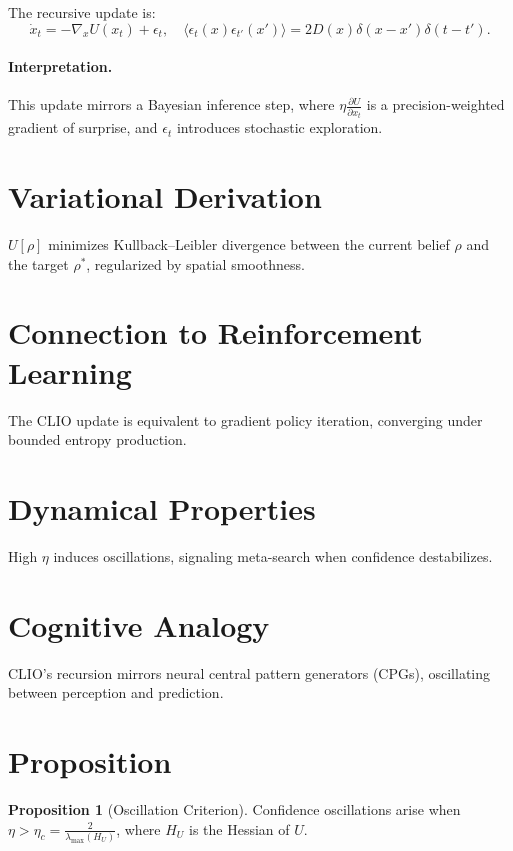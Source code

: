 \documentclass[12pt]{book}
\theoremstyle{definition}
\newtheorem{proposition}{Proposition}[chapter]
\begin{document}
The recursive update is:
\begin{equation}
\dot{x}_t = -\nabla_x U(x_t) + \epsilon_t, \quad \langle \epsilon_t(x) \epsilon_{t'}(x') \rangle = 2D(x) \delta(x-x') \delta(t-t').
\end{equation}

\paragraph{Interpretation.} This update mirrors a Bayesian inference step, where $\eta \frac{\partial U}{\partial x_t}$ is a precision-weighted gradient of surprise, and $\epsilon_t$ introduces stochastic exploration.

\section{Variational Derivation}
$U[\rho]$ minimizes Kullback–Leibler divergence between the current belief $\rho$ and the target $\rho^*$, regularized by spatial smoothness.

\section{Connection to Reinforcement Learning}
The CLIO update is equivalent to gradient policy iteration, converging under bounded entropy production.

\section{Dynamical Properties}
High $\eta$ induces oscillations, signaling meta-search when confidence destabilizes.

\section{Cognitive Analogy}
CLIO’s recursion mirrors neural central pattern generators (CPGs), oscillating between perception and prediction.

\section{Proposition}
\begin{proposition}[Oscillation Criterion]
\label{prop:oscillation}
Confidence oscillations arise when $\eta > \eta_c = \frac{2}{\lambda_{\max}(H_U)}$, where $H_U$ is the Hessian of $U$.
\end{proposition}
\end{document}
